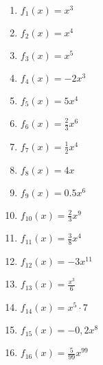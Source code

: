 
\begin{Exercise}[title={\raggedright Berechne jeweils allgemein die Ableitung \(f'(x)\)}, label=potenzregelA1]

		\begin{minipage}{\textwidth}
			\begin{minipage}{0.5\textwidth}
				\begin{enumerate}[label=\alph*)]
					\item \(f_1(x)=x^3\)
					\item \(f_2(x)=x^4\)
					\item \(f_3(x)=x^5\)
					\item \(f_4(x)=-2x^3\)
					\item \(f_5(x)=5x^4\)
					\item \(f_6(x)=\frac{2}{3}x^6\)
					\item \(f_7(x)=\frac{1}{2}x^4\)
					\item \(f_8(x)=4x\)
				\end{enumerate}
			\end{minipage}%
			\begin{minipage}{0.5\textwidth}
				\begin{enumerate}[label=\alph*)]
					\setcounter{enumi}{8}
					\item \(f_9(x)=0.5x^6\)
					\item \(f_{10}(x)=\frac{2}{3}x^9\)
					\item \(f_{11}(x)=\frac{3}{8}x^4\)
					\item \(f_{12}(x)=-3x^{11}\)
					\item \(f_{13}(x)=\frac{x^3}{6}\)
					\item \(f_{14}(x)=x^5\cdot 7\)
					\item \(f_{15}(x)=-0,2x^8\)
					\item \(f_{16}(x)=\frac{5}{99}x^{99}\)
				\end{enumerate}
			\end{minipage}%
		\end{minipage}
\end{Exercise}
